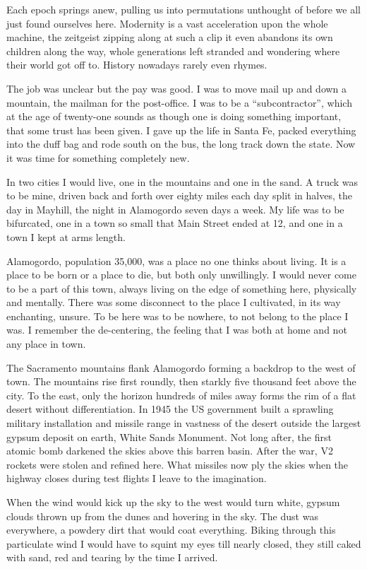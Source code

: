 \documentclass[ebook, 10pt, openright, onecolumn]{memoir}
\newlength{\drop}
\newcommand*\td[1]{
  \todo[inline]{
     #1 
  }
}
\newcommand*\finish{\td{ ----- Finish this section -----}}
\begin{document}
Each epoch springs anew, pulling us into permutations unthought of before we all
just found ourselves here.  Modernity is a vast acceleration upon the whole
machine, the zeitgeist zipping along at such a clip it even abandons its own
children along the way, whole generations left stranded and wondering where
their world got off to.  History nowadays rarely even rhymes.
\finish{}

The job was unclear but the pay was good.  I was to move mail up and down a
mountain, the mailman for the post-office.  I was to be a ``subcontractor'', which
at the age of twenty-one sounds as though one is doing something important, that
some trust has been given.  I gave up the life in Santa Fe,  packed everything
into the duff bag and rode south on the bus, the long track down the state.  Now
it was time for something completely new.

In two cities I would live, one in the mountains and one in the sand.  A truck
was to be mine, driven back and forth over eighty miles each day split in
halves, the day in Mayhill, the night in Alamogordo seven days a week.  My life
was to be bifurcated, one in a town so small that Main Street ended at 12, and
one in a town I kept at arms length.

Alamogordo, population 35,000, was a place no one thinks about living.  It is a
place to be born or a place to die, but both only unwillingly.  I would never
come to be a part of this town, always living on the edge of something here,
physically and mentally.  There was some disconnect to the place I cultivated,
in its way enchanting, unsure.  To be here was to be nowhere, to not belong to
the place I was.  I remember the de-centering, the feeling that I was both at
home and not any place in town.

The Sacramento mountains flank Alamogordo forming a backdrop to the west of
town.  The mountains rise first roundly, then starkly five thousand feet above
the city.  To the east, only the horizon hundreds of miles away forms the rim of
a flat desert without differentiation.  In 1945 the US government built a
sprawling military installation and missile range in vastness of the desert
outside the largest gypsum deposit on earth, White Sands Monument.  Not long
after, the first atomic bomb darkened the skies above this barren basin.  After
the war, V2 rockets were stolen and refined here.  What missiles now ply the
skies when the highway closes during test flights I leave to the imagination.

When the wind would kick up the sky to the west would turn white, gypsum clouds
thrown up from the dunes and hovering in the sky.  The dust was everywhere, a
powdery dirt that would coat everything.  Biking through this particulate wind I
would have to squint my eyes till nearly closed, they still caked with sand, red
and tearing by the time I arrived.  
\end{document}
